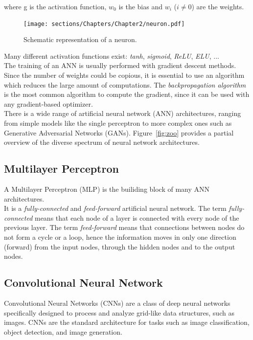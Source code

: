 where g is the activation function, $w_{0}$ is the bias and $w_{i}$ ($i \ne 0$) are the weights.

\begin{figure}[h]
\centering
\texttt{[image: sections/Chapters/Chapter2/neuron.pdf]}
\caption{Schematic representation of a neuron.}
\end{figure}


Many different activation functions exist: \textit{tanh}, \textit{sigmoid}, \textit{ReLU}, \textit{ELU}, ...\\
The training of an ANN is usually performed with gradient descent methods.
Since the number of weights could be copious, it is essential to use an algorithm which reduces the large amount of computations.
The \textit{backpropagation algorithm} is the most common algorithm to compute the gradient, since it can be used with any gradient-based optimizer.\\

There is a wide range of artificial neural network (ANN) architectures, ranging from simple models like the single perceptron to more complex ones 
such as Generative Adversarial Networks (GANs). Figure~\ref{fig:zoo} provides a partial overview of the diverse spectrum of neural network architectures.

\subsection{Multilayer Perceptron}

A Multilayer Perceptron (MLP) is the builiding block of many ANN architectures.\\
It is a \textit{fully-connected} and \textit{feed-forward} artificial neural network.
The term \textit{fully-connected} means that each node of a layer is connected with every node of the previous layer.
The term \textit{feed-forward} means that connections between nodes do not form a cycle or a loop, hence the information moves in only 
one direction (forward) from the input nodes, through the hidden nodes and to the output nodes.


\subsection{Convolutional Neural Network}

Convolutional Neural Networks (CNNs) are a class of deep neural networks specifically designed to process and analyze grid-like data structures, 
such as images. CNNs are the standard architecture for tasks such as image 
classification, object detection, and image generation.\\

